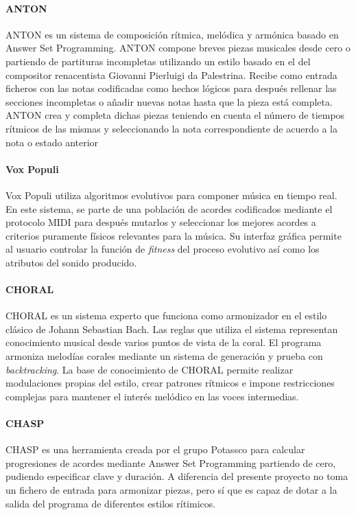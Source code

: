 \paragraph{ANTON}
ANTON es un sistema de composición rítmica, melódica y armónica basado en Answer Set Programming. ANTON compone breves piezas musicales desde cero o partiendo de partituras incompletas utilizando un estilo basado en el del compositor renacentista Giovanni Pierluigi da Palestrina. Recibe como entrada ficheros con las notas codificadas como hechos lógicos para después rellenar las secciones incompletas o añadir nuevas notas hasta que la pieza está completa. ANTON crea y completa dichas piezas teniendo en cuenta el número de tiempos rítmicos de las mismas y seleccionando la nota correspondiente de acuerdo a la nota  o estado anterior

\paragraph{Vox Populi}
Vox Populi utiliza algoritmos evolutivos para componer música en tiempo real. En este sistema, se parte de una población de acordes codificados mediante el protocolo MIDI para después mutarlos y seleccionar los mejores acordes a criterios puramente físicos relevantes para la música. Su interfaz gráfica permite al usuario controlar la función de \textit{fitness} del proceso evolutivo así como los atributos del sonido producido.


\paragraph{CHORAL}
CHORAL es un sistema experto que funciona como armonizador en el estilo clásico de Johann Sebastian Bach. Las reglas que utiliza el sistema representan conocimiento musical desde varios puntos de vista de la coral. El programa armoniza melodías corales mediante un sistema de generación y prueba con \textit{backtracking}. La base de conocimiento de CHORAL permite realizar modulaciones propias del estilo, crear patrones rítmicos e impone restricciones complejas para mantener el interés melódico en las voces intermedias.

\paragraph{CHASP}
CHASP es una herramienta creada por el grupo Potassco para calcular progresiones de acordes mediante Answer Set Programming partiendo de cero, pudiendo especificar clave y duración. A diferencia del presente proyecto no toma un fichero de entrada para armonizar piezas, pero sí que es capaz de dotar a la salida del programa de diferentes estilos rítimicos.

